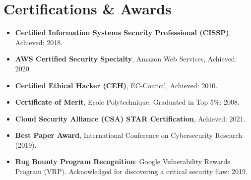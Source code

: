 
\section{Certifications \& Awards}

\begin{itemize}
    \item[\textrightarrow] \textbf{Certified Information Systems Security Professional (CISSP)}, Achieved: 2018. \vspace{0.13cm}
    \item[\textrightarrow] \textbf{AWS Certified Security Specialty}, Amazon Web Services, Achieved: 2020. \vspace{0.13cm}
    \item[\textrightarrow] \textbf{Certified Ethical Hacker (CEH)}, EC-Council, Achieved: 2010. \vspace{0.13cm}
    \item[\textrightarrow] \textbf{Certificate of Merit}, Ecole Polytechnique. Graduated in Top 5\%: 2008. \vspace{0.13cm}
    \item[\textrightarrow] \textbf{Cloud Security Alliance (CSA) STAR Certification}, Achieved: 2021. \vspace{0.13cm}
    \item[\textrightarrow] \textbf{Best Paper Award}, International Conference on Cybersecurity Research (2019). \vspace{0.13cm}
    \item[\textrightarrow] \textbf{Bug Bounty Program Recognition}: Google Vulnerability Rewards Program (VRP). Acknowledged for discovering a critical security flaw: 2019.
\end{itemize}
